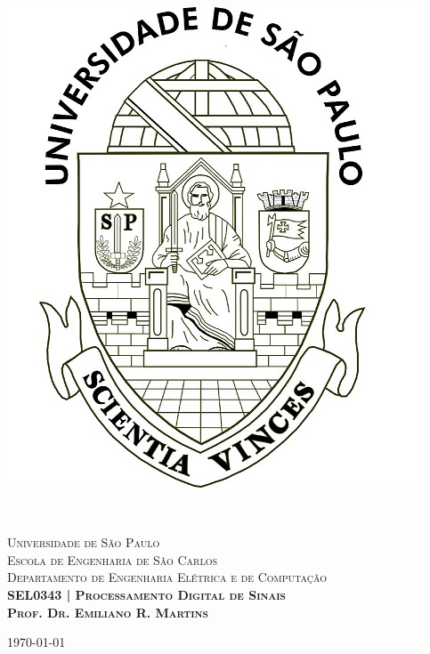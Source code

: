 \begin{minipage}{0.15\textwidth}
    \begin{flushleft}
        \includegraphics[width=\linewidth]{logo.png}
    \end{flushleft}
\end{minipage}
~
\begin{minipage}{0.75\textwidth}
    \textsc{Universidade de São Paulo}\\
    \textsc{Escola de Engenharia de São Carlos}\\
    \textsc{Departamento de Engenharia Elétrica e de Computação}\\
    \textsc{\textbf{SEL0343 | Processamento Digital de Sinais}}\\
    \textsc{\textbf{Prof. Dr. Emiliano R. Martins}}
\end{minipage}

\begin{flushright}
    {\small \today}
\end{flushright}


